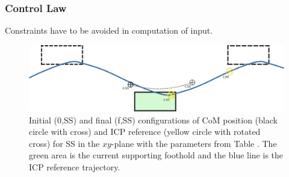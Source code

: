 \subsubsection{Control Law}
Constraints have to be avoided in computation of input.\\


\begin{figure}[h]
\centering
  \includegraphics[width=.8\linewidth]{STYLESTUFF/ICPplan3StepComICPrSS.png}
   \caption{Initial (0,SS) and final (f,SS) configurations of \ac{CoM} position (black circle with cross) and \ac{ICP} reference (yellow circle with rotated cross) for \ac{SS} in the $xy$-plane with the parameters from Table . The green area is the current supporting foothold and the blue line is the \ac{ICP} reference trajectory.}
    \label{fig:3foot}
\end{figure}


